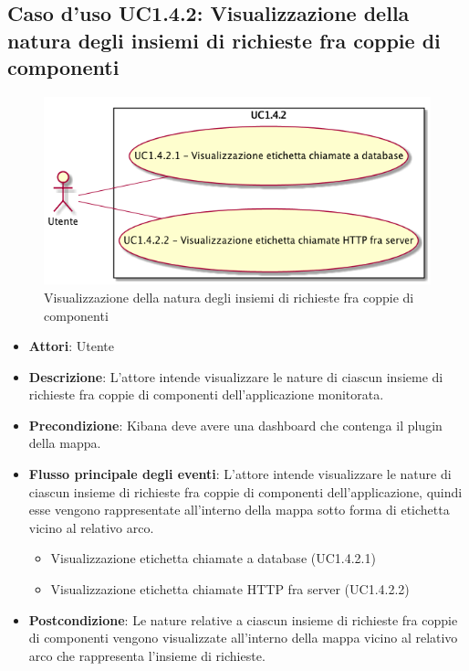 \subsection{Caso d'uso UC1.4.2: Visualizzazione della natura degli insiemi di richieste fra coppie di componenti}
\begin{figure} [H]
	\centering
	\includegraphics[scale=0.45]{./UC/UC1-4-2.png}
	\caption{Visualizzazione della natura degli insiemi di richieste fra coppie di componenti}\label{}
\end{figure}
\begin{itemize}
	\item \textbf{Attori}: Utente
	\item \textbf{Descrizione}: L'attore intende visualizzare le nature di ciascun insieme di richieste fra coppie di componenti dell'applicazione monitorata.
	\item \textbf{Precondizione}: Kibana deve avere una dashboard che contenga il plugin della mappa.
	
	\item \textbf{Flusso principale degli eventi}: L'attore intende visualizzare le nature di ciascun insieme di richieste fra coppie di componenti dell'applicazione, quindi esse vengono rappresentate all'interno della mappa sotto forma di etichetta vicino al relativo arco.
	\begin{itemize}
		\item Visualizzazione etichetta chiamate a database (UC1.4.2.1)
		\item Visualizzazione etichetta chiamate HTTP fra server (UC1.4.2.2)
	\end{itemize}
	\item \textbf{Postcondizione}: Le nature relative a ciascun insieme di richieste fra coppie di componenti vengono visualizzate all'interno della mappa vicino al relativo arco che rappresenta l'insieme di richieste.
\end{itemize}
